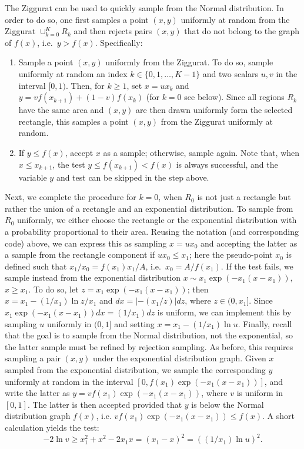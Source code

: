 The Ziggurat can be used to quickly sample from the Normal distribution. In order to do so, one first samples a point $(x,y)$ uniformly at random from the Ziggurat $\cup_{k=0}^K R_k$ and then rejects pairs $(x,y)$ that do not belong to the graph of $f(x)$, i.e.\ $y > f(x)$. Specifically:
\begin{enumerate}
\item Sample a point $(x,y)$ uniformly from the Ziggurat. To do so, sample uniformly at random an index $k \in\{0,1,\dots,K-1\}$ and two scalars $u,v$ in the interval $[0,1)$. Then, for $k\geq 1$, set $x = u x_k$ and $y = v f(x_{k+1}) + (1-v)f(x_k)$ (for $k=0$ see below). Since all regions $R_k$ have the same area and $(x,y)$ are then drawn uniformly form the selected rectangle, this samples a point $(x,y)$ from the Ziggurat uniformly at random.
\item If $y \leq f(x)$, accept $x$ as a sample; otherwise, sample again. Note that, when $x \leq x_{k+1}$, the test $y \leq f(x_{k+1}) < f(x)$ is always successful, and the variable $y$ and test can be skipped in the step above.
\end{enumerate}
Next, we complete the procedure for $k=0$, when $R_0$ is not just a rectangle but rather the union of a rectangle and an exponential distribution. To sample from $R_0$ uniformly, we either choose the rectangle or the exponential distribution with a probability proportional to their area. Reusing the notation (and corresponding code) above, we can express this as sampling $x = u x_0$ and accepting the latter as a sample from the rectangle component if $ux_0 \leq x_1$; here the pseudo-point $x_0$ is defined such that $x_1 / x_0 = f(x_1)x_1 / A$, i.e.\ $x_0 = A/f(x_1)$. If the test fails, we sample instead from the exponential distribution $x\sim x_1\exp(-x_1(x-x_1)),$ $x\geq x_1$. To do so, let $z= x_1\exp(-x_1(x-x_1))$; then $x = x_1 - (1/x_1) \ln z/x_1$ and $dx = |- (x_1/z)|dz$, where $z\in(0,x_1]$. Since $x_1\exp(-x_1(x-x_1)) dx = (1/x_1) dz$ is uniform, we can implement this by sampling $u$ uniformly in $(0,1]$ and setting $x = x_1 - (1/x_1) \ln u$. Finally, recall that the goal is to sample from the Normal distribution, not the exponential, so the latter sample must be refined by rejection sampling. As before, this requires sampling a pair $(x,y)$ under the exponential distribution graph. Given $x$ sampled from the exponential distribution, we sample the corresponding $y$ uniformly at random in the interval $[0, f(x_1) \exp(-x_1(x-x_1))]$, and write the latter as $y = v f(x_1) \exp(-x_1(x-x_1))$, where $v$ is uniform in $[0,1]$. The latter is then accepted provided that $y$ is below the Normal distribution graph $f(x)$, i.e. $v f(x_1) \exp(-x_1(x-x_1)) \leq f(x).$ A short calculation yields the test:
\[
-2\ln v \geq x_1^2 +  x^2 - 2x_1x = (x_1 - x)^2 =
((1/x_1) \ln u)^2.
\]

